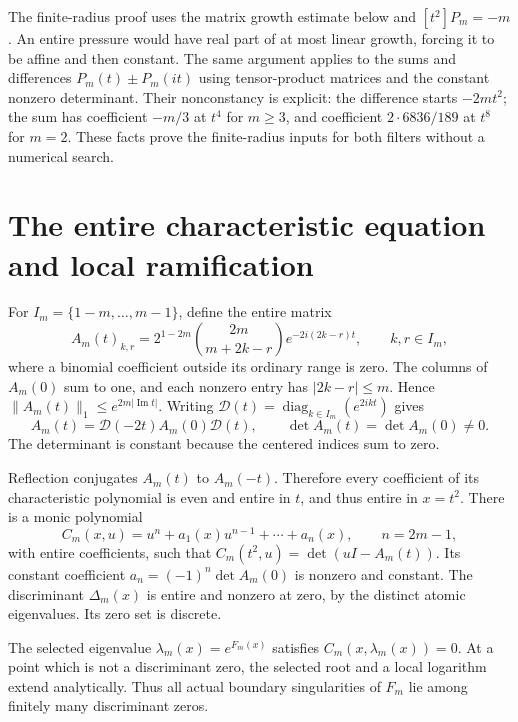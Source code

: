 \documentclass[11pt,a4paper]{article}
\theoremstyle{remark}\newtheorem*{ednote}{Editorial note (ProveIt, 2026-10-01)}
\begin{document}
The finite-radius proof uses the matrix growth estimate below and $[t^2]P_m=-m$. An entire pressure would have real part of at most linear growth, forcing it to be affine and then constant. The same argument applies to the sums and differences $P_m(t)\pm P_m(it)$ using tensor-product matrices and the constant nonzero determinant. Their nonconstancy is explicit: the difference starts $-2mt^2$; the sum has coefficient $-m/3$ at $t^4$ for $m\ge3$, and coefficient $2\cdot6836/189$ at $t^8$ for $m=2$. These facts prove the finite-radius inputs for both filters without a numerical search.

\section{The entire characteristic equation and local ramification}
For $I_m=\{1-m,\ldots,m-1\}$, define the entire matrix
\begin{equation}\label{eq:matrix}
 A_m(t)_{k,r}=2^{1-2m}\binom{2m}{m+2k-r}e^{-2i(2k-r)t},
 \qquad k,r\in I_m,
\end{equation}
where a binomial coefficient outside its ordinary range is zero.
The columns of $A_m(0)$ sum to one, and each nonzero entry has $|2k-r|\le m$. Hence
$\|A_m(t)\|_1\le e^{2m|\operatorname{Im}t|}$.
Writing $\mathcal D(t)=\operatorname{diag}_{k\in I_m}(e^{2ikt})$ gives
\[
 A_m(t)=\mathcal D(-2t)A_m(0)\mathcal D(t),\qquad
 \det A_m(t)=\det A_m(0)\ne0.
\]
The determinant is constant because the centered indices sum to zero.

Reflection conjugates $A_m(t)$ to $A_m(-t)$. Therefore every coefficient of its characteristic polynomial is even and entire in $t$, and thus entire in $x=t^2$. There is a monic polynomial
\[
 C_m(x,u)=u^n+a_1(x)u^{n-1}+\cdots+a_n(x),\qquad n=2m-1,
\]
with entire coefficients, such that $C_m(t^2,u)=\det(uI-A_m(t))$.
Its constant coefficient $a_n=(-1)^n\det A_m(0)$ is nonzero and constant.
The discriminant $\Delta_m(x)$ is entire and nonzero at zero, by the distinct atomic eigenvalues. Its zero set is discrete.

The selected eigenvalue $\lambda_m(x)=e^{F_m(x)}$ satisfies
$C_m(x,\lambda_m(x))=0$. At a point which is not a discriminant zero, the selected root and a local logarithm extend analytically. Thus all actual boundary singularities of $F_m$ lie among finitely many discriminant zeros.
\end{document}
